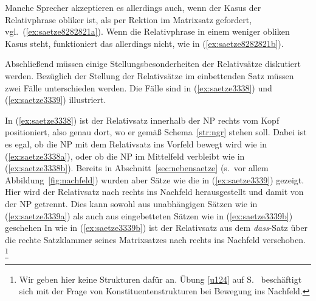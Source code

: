 Manche Sprecher akzeptieren es allerdings auch, wenn der Kasus der Relativphrase obliker ist, als per Rektion im Matrixsatz gefordert, vgl.\ (\ref{ex:saetze8282821a}).
Wenn die Relativphrase in einem weniger obliken Kasus steht, funktioniert das allerdings nicht, wie in (\ref{ex:saetze8282821b}).

\begin{exe}
  \ex\label{ex:saetze8282821} 
  \begin{xlist}
  \end{xlist}
\end{exe}

Abschließend müssen einige Stellungsbesonderheiten der Relativsätze diskutiert werden. 
Bezüglich der Stellung der Relativsätze im einbettenden Satz müssen zwei Fälle unterschieden werden.
Die Fälle sind in (\ref{ex:saetze3338}) und (\ref{ex:saetze3339}) illustriert.

\begin{exe}
  \ex\label{ex:saetze3338}
  \begin{xlist}
  \end{xlist}
  \ex\label{ex:saetze3339}
  \begin{xlist}
  \end{xlist}
\end{exe}

In (\ref{ex:saetze3338}) ist der Relativsatz innerhalb der NP rechts vom Kopf positioniert, also genau dort, wo er gemäß Schema~\ref{str:ngr} stehen soll.
Dabei ist es egal, ob die NP mit dem Relativsatz ins Vorfeld bewegt wird wie in (\ref{ex:saetze3338a}), oder ob die NP im Mittelfeld verbleibt wie in (\ref{ex:saetze3338b}).
Bereits in Abschnitt~\ref{sec:nebensaetze} (s.\ vor allem Abbildung~\ref{fig:nachfeld}) wurden aber Sätze wie die in (\ref{ex:saetze3339}) gezeigt.
Hier wird der Relativsatz nach rechts ins Nachfeld herausgestellt und damit von der NP getrennt.
Dies kann sowohl aus unabhängigen Sätzen wie in (\ref{ex:saetze3339a}) als auch aus eingebetteten Sätzen wie in (\ref{ex:saetze3339b}) geschehen
In wie in (\ref{ex:saetze3339b}) ist der Relativsatz aus dem \textit{dass}-Satz über die rechte Satzklammer seines Matrixsatzes nach rechts ins Nachfeld verschoben.%
\footnote{Wir geben hier keine Strukturen dafür an.
Übung \ref{u124} auf S.~\pageref{u124} beschäftigt sich mit der Frage von Konstituentenstrukturen bei Bewegung ins Nachfeld.}

